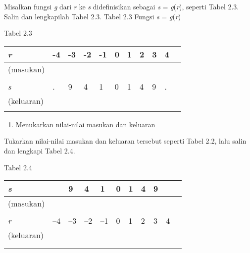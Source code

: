 \documentclass[11pt,fleqn]{book} %
\begin{document}
\noindent Misalkan fungsi \textit{g} dari \textit{r} ke \textit{s} didefinisikan sebagai \textit{s} = \textit{g}(\textit{r}), seperti Tabel 2.3. Salin dan lengkapilah Tabel 2.3. Tabel 2.3\textbf{ }Fungsi\textbf{ }\textit{s}\textbf{ }=\textbf{ }\textit{g}(\textit{r})

\noindent Tabel 2.3

\noindent 

\begin{tabular}{|p{0.6in}|p{0.4in}|p{0.3in}|p{0.2in}|p{0.2in}|p{0.2in}|p{0.2in}|p{0.2in}|p{0.2in}|p{0.2in}|p{0.2in}|} \hline 
\textit{r}  & -4 & -3 & -2 & -1 & 0 & 1 & 2 & 3 & 4 \\ \hline 
 (masukan) &  &  &  &  &  &  &  &  &  \\ \hline 
 &  &  &  &  &  &  &  &  &  &  \\ \hline 
\textit{s}  & . & 9 & 4 & 1 & 0 & 1 & 4 & 9 & . \\ \hline 
 (keluaran) &  &  &  &  &  &  &  &  &  \\ \hline 
 &  &  &  &  &  &  &  &  &  &  \\ \hline 
\end{tabular}



\begin{enumerate}
\item  Menukarkan nilai-nilai masukan dan keluaran
\end{enumerate}

\noindent Tukarkan nilai-nilai masukan dan keluaran tersebut seperti Tabel 2.2, lalu salin dan lengkapi Tabel 2.4.

\noindent \textbf{}

\noindent Tabel 2.4

\noindent 

\begin{tabular}{|p{0.6in}|p{0.4in}|p{0.3in}|p{0.2in}|p{0.2in}|p{0.2in}|p{0.2in}|p{0.2in}|p{0.2in}|p{0.2in}|p{0.2in}|} \hline 
\textit{s}  &  & 9 & 4 & 1 & 0 & 1 & 4 & 9 &  \\ \hline 
 (masukan) &  &  &  &  &  &  &  &  &  \\ \hline 
 &  &  &  &  &  &  &  &  &  &  \\ \hline 
\textit{r}  & --4 & --3 & --2 & --1 & 0 & 1 & 2 & 3 & 4 \\ \hline 
 (keluaran) &  &  &  &  &  &  &  &  &  \\ \hline 
 &  &  &  &  &  &  &  &  &  &  \\ \hline 
 &  &  &  &  &  &  &  &  &  &  \\ \hline 
\end{tabular}
\end{document}
